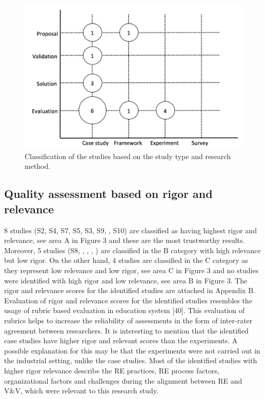 \documentclass{article}
\begin{document}
\begin{figure}
    \centering
    \includegraphics[width=\textwidth]{Classification.png}
    \caption{Classification of the studies based on the study type and research method.}
    \label{fig:my_label}
\end{figure}

\subsection{Quality assessment based on rigor and relevance}\label{RigorAndRelevance}

8 studies (S2, S4, S7, S5, S3, S9, \cite{bjarnason2014alignment}, S10) are classified as having highest rigor and relevance, see area A in Figure 3 and these are the most trustworthy results. Moreover, 5 studies (S8, \cite{metsa2007testing}, \cite{lobo2005local}, \cite{bjarnason2015industrial}, \cite{ferguson2006empirical}) are classified in the B category with high relevance but low rigor. On the other hand, 4 studies are classified in the C category as they represent low relevance and low rigor, see area C in Figure 3 and no studies were identified with high rigor and low relevance, see area B in Figure 3. The rigor and relevance scores for the identified studies are attached in Appendix B. 
Evaluation of rigor and relevance scores for the identified studies resembles the usage of rubric based evaluation in education system [40]. This evaluation of rubrics helps to increase the reliability of assessments in the form of inter-rater agreement between researchers. 
It is interesting to mention that the identified case studies have higher rigor and relevant scores than the experiments. A possible explanation for this may be that the experiments were not carried out in the industrial setting, unlike the case studies. Most of the identified studies with higher rigor relevance describe the RE practices, RE process factors, organizational factors and challenges during the alignment between RE and V&V, which were relevant to this research study. 
\end{document}
